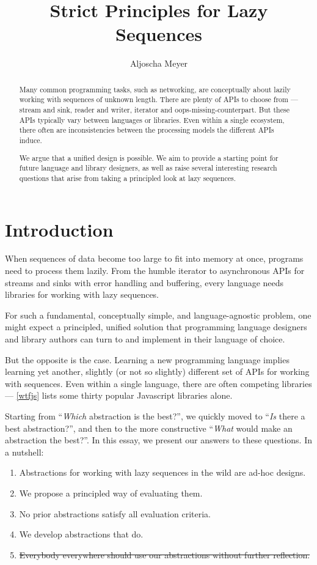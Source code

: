 \documentclass[sigplan,screen,10pt,review]{acmart}
\title{Strict Principles for Lazy Sequences}
\author{Aljoscha Meyer}
\affiliation{%
  \institution{Technical University Berlin}
  \city{Berlin}
  \country{Germany}
}
\begin{document}
\begin{abstract}
Many common programming tasks, such as networking, are conceptually about lazily working with sequences of unknown length. There are plenty of APIs to choose from --- stream and sink, reader and writer, iterator and oops-missing-counterpart. But these APIs typically vary between languages or libraries. Even within a single ecosystem, there often are inconsistencies between the processing models the different APIs induce.

We argue that a unified design is possible. We aim to provide a starting point for future language and library designers, as well as raise several interesting research questions that arise from taking a principled look at lazy sequences.
\end{abstract}

\maketitle

\section{Introduction}\label{introduction}

When sequences of data become too large to fit into memory at once, programs need to process them lazily. From the humble iterator to asynchronous APIs for streams and sinks with error handling and buffering, every language needs libraries for working with lazy sequences.

For such a fundamental, conceptually simple, and language-agnostic problem, one might expect a principled, unified solution that programming language designers and library authors can turn to and implement in their language of choice.

But the opposite is the case. Learning a new programming language implies learning yet another, slightly (or not so slightly) different set of APIs for working with sequences. Even within a single language, there are often competing libraries --- \cref{wtfjs} lists some thirty popular Javascript libraries alone.

Starting from ``\textit{Which} abstraction is the best?'', we quickly moved to ``\textit{Is} there a best abstraction?'', and then to the more constructive ``\textit{What} would make an abstraction the best?''. In this essay, we present our answers to these questions. In a nutshell:

\begin{enumerate}
    \item Abstractions for working with lazy sequences in the wild are ad-hoc designs.
    \item We propose a principled way of evaluating them.
    \item No prior abstractions satisfy all evaluation criteria.
    \item We develop abstractions that do.
    \item \sout{Everybody everywhere should use our abstractions without further reflection.}
\end{enumerate}
\end{document}
